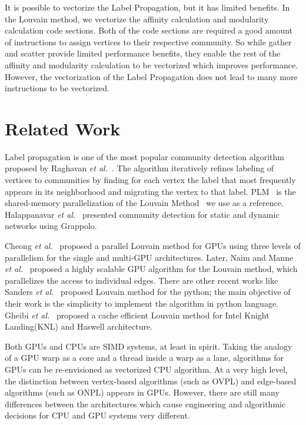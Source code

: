 \documentclass[default,iicol]{sn-jnl}%
\theoremstyle{thmstyleone}%
\theoremstyle{thmstyletwo}%
\theoremstyle{thmstylethree}%
\begin{document}
It is possible to vectorize the Label Propagation, but it has limited
benefits. In the Louvain method, we vectorize the affinity calculation
and modularity calculation code sections. Both of the code sections
are required a good amount of instructions to assign vertices to their
respective community. So while gather and scatter provide limited
performance benefits, they enable the rest of the affinity and
modularity calculation to be vectorized which improves
performance. However, the vectorization of the Label Propagation does
not lead to many more instructions to be vectorized. 

\section{Related Work}

Label propagation is one of the most popular community detection
algorithm proposed by Raghavan \textit{et
  al.}~\cite{raghavan2007near}.  The algorithm iteratively refines
labeling of vertices to communities by finding for each vertex the
label that most frequently appears in its neighborhood and migrating
the vertex to that label. PLM~\cite{plm} is the shared-memory
parallelization of the Louvain Method~\cite{Vincent} we use as a reference. Halappanavar \textit{et
  al.}~\cite{halappanavar2017scalable} presented community detection
for static and dynamic networks using Grappolo.

Cheong \textit{et al.}~\cite{cheong2013hierarchical} proposed
a parallel Louvain method for GPUs using three levels of
parallelism for the single and multi-GPU architectures. Later, Naim
and Manne \textit{et al.}~\cite{Naim17} proposed a highly scalable GPU
algorithm for the Louvain method, which parallelizes the access to
individual edges. There are other recent works like 
Sanders \textit{et al.}~\cite{low2020linear} proposed Louvain method for the python; 
the main objective of their work is the simplicity to implement the algorithm in 
python language. Gheibi \textit{et al.}~\cite{gheibi2020cache} proposed a cache efficient 
Louvain method for Intel Knight Landing(KNL) and Haswell architecture.

Both GPUs and CPUs are SIMD systems, at least in spirit. Taking the
analogy of a GPU warp as a core and a thread inside a warp as a lane,
algorithms for GPUs can be re-envisioned as vectorized CPU
algorithm. At a very high level, the distinction between
vertex-based algorithms (such as OVPL) and edge-based algorithms (such
as ONPL) appears in GPUs. However, there are still many differences
between the architectures which cause engineering and algorithmic
decisions for CPU and GPU systems very different.
\end{document}
